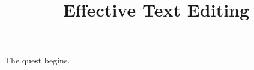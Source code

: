 \documentclass{article}
\title{Effective Text Editing}
\begin{document}
The quest begins.
\end{document}
